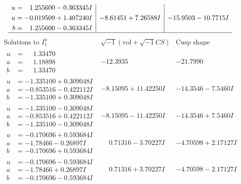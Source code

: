 \documentclass[1p]{elsarticle_modified}
\theoremstyle{definition}
\newcommand{\I}{\sqrt{-1}}
\begin{document}
$$\begin{array}{c|c|c}
\begin{aligned}
u &= \phantom{-}1.255600 - 0.363345 I \\
a &= -0.019509 + 1.407240 I \\
b &= \phantom{-}1.255600 - 0.363345 I\end{aligned}
 & -8.61451 + 7.26588 I & -15.9503 - 10.7715 I\\
 \hline 
 \end{array}$$\newpage$$\begin{array}{c|c|c}  
\text{Solutions to }I^u_{1}& \I (\text{vol} + \sqrt{-1}CS) & \text{Cusp shape}\\
 \hline 
\begin{aligned}
u &= \phantom{-}1.33470\phantom{ +0.000000I} \\
a &= \phantom{-}1.18898\phantom{ +0.000000I} \\
b &= \phantom{-}1.33470\phantom{ +0.000000I}\end{aligned}
 & -12.3935\phantom{ +0.000000I} & -21.7990\phantom{ +0.000000I} \\ \hline\begin{aligned}
u &= -1.335100 + 0.309048 I \\
a &= -0.853516 - 0.422112 I \\
b &= -1.335100 + 0.309048 I\end{aligned}
 & -8.15095 + 11.42250 I & -14.3546 - 7.5460 I \\ \hline\begin{aligned}
u &= -1.335100 - 0.309048 I \\
a &= -0.853516 + 0.422112 I \\
b &= -1.335100 - 0.309048 I\end{aligned}
 & -8.15095 - 11.42250 I & -14.3546 + 7.5460 I \\ \hline\begin{aligned}
u &= -0.170696 + 0.593684 I \\
a &= -1.78466 - 0.26897 I \\
b &= -0.170696 + 0.593684 I\end{aligned}
 & \phantom{-}0.71316 - 3.70227 I & -4.70598 + 2.17127 I \\ \hline\begin{aligned}
u &= -0.170696 - 0.593684 I \\
a &= -1.78466 + 0.26897 I \\
b &= -0.170696 - 0.593684 I\end{aligned}
 & \phantom{-}0.71316 + 3.70227 I & -4.70598 - 2.17127 I \\ \hline\begin{aligned}

\end{aligned}
\end{array}$$
\end{document}
